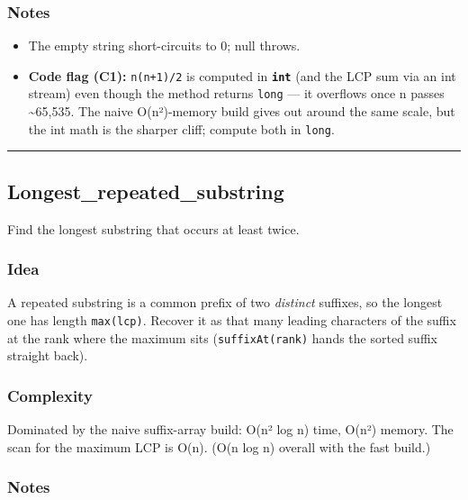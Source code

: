 \documentclass[
  10pt,
  letterpaper,
  onecolumn]{article}
\providecommand{\tightlist}{%
  \setlength{\itemsep}{0pt}\setlength{\parskip}{0pt}}
\begin{document}
\hypertarget{notes}{%
\subsubsection{Notes}\label{notes}}

\begin{itemize}
\tightlist
\item
  The empty string short-circuits to 0; null throws.
\item
  \textbf{Code flag (C1):} \texttt{n(n+1)/2} is computed in
  \textbf{\texttt{int}} (and the LCP sum via an int stream) even though
  the method returns \texttt{long} --- it overflows once n passes
  \textasciitilde65,535. The naive O(n²)-memory build gives out around
  the same scale, but the int math is the sharper cliff; compute both in
  \texttt{long}.
\end{itemize}

\begin{center}\rule{0.5\linewidth}{0.5pt}\end{center}

\hypertarget{longest_repeated_substring}{%
\subsection{Longest\_repeated\_substring}\label{longest_repeated_substring}}

Find the longest substring that occurs at least twice.

\hypertarget{idea-1}{%
\subsubsection{Idea}\label{idea-1}}

A repeated substring is a common prefix of two \emph{distinct} suffixes,
so the longest one has length \texttt{max(lcp)}. Recover it as that many
leading characters of the suffix at the rank where the maximum sits
(\texttt{suffixAt(rank)} hands the sorted suffix straight back).

\hypertarget{complexity-1}{%
\subsubsection{Complexity}\label{complexity-1}}

Dominated by the naive suffix-array build: O(n² log n) time, O(n²)
memory. The scan for the maximum LCP is O(n). (O(n log n) overall with
the fast build.)

\hypertarget{notes-1}{%
\subsubsection{Notes}\label{notes-1}}
\end{document}
